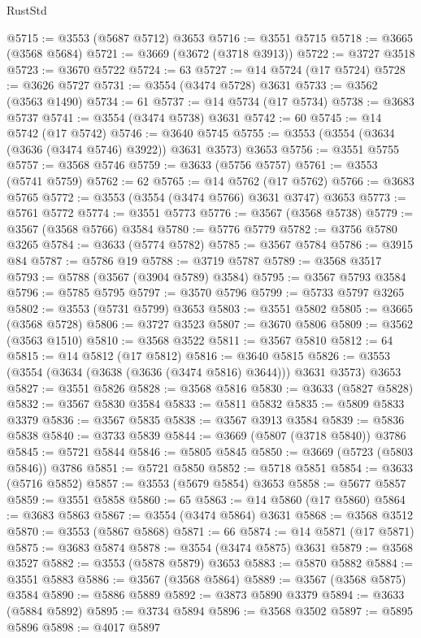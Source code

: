 \begin{lexlean}{RustStd}
\begin{coremodule}
@5715 := @3553 (@5687 @5712) @3653
@5716 := @3551 @5715
@5718 := @3665 (@3568 @5684)
@5721 := @3669 (@3672 (@3718 @3913))
@5722 := @3727 @3518
@5723 := @3670 @5722
@5724 := 63
@5727 := @14 @5724 (@17 @5724)
@5728 := @3626 @5727
@5731 := @3554 (@3474 @5728) @3631
@5733 := @3562 (@3563 @1490)
@5734 := 61
@5737 := @14 @5734 (@17 @5734)
@5738 := @3683 @5737
@5741 := @3554 (@3474 @5738) @3631
@5742 := 60
@5745 := @14 @5742 (@17 @5742)
@5746 := @3640 @5745
@5755 := @3553 (@3554 (@3634 (@3636 (@3474 @5746) @3922)) @3631 @3573) @3653
@5756 := @3551 @5755
@5757 := @3568 @5746
@5759 := @3633 (@5756 @5757)
@5761 := @3553 (@5741 @5759)
@5762 := 62
@5765 := @14 @5762 (@17 @5762)
@5766 := @3683 @5765
@5772 := @3553 (@3554 (@3474 @5766) @3631 @3747) @3653
@5773 := @5761 @5772
@5774 := @3551 @5773
@5776 := @3567 (@3568 @5738)
@5779 := @3567 (@3568 @5766) @3584
@5780 := @5776 @5779
@5782 := @3756 @5780 @3265
@5784 := @3633 (@5774 @5782)
@5785 := @3567 @5784
@5786 := @3915 @84
@5787 := @5786 @19
@5788 := @3719 @5787
@5789 := @3568 @3517
@5793 := @5788 (@3567 (@3904 @5789) @3584)
@5795 := @3567 @5793 @3584
@5796 := @5785 @5795
@5797 := @3570 @5796
@5799 := @5733 @5797 @3265
@5802 := @3553 (@5731 @5799) @3653
@5803 := @3551 @5802
@5805 := @3665 (@3568 @5728)
@5806 := @3727 @3523
@5807 := @3670 @5806
@5809 := @3562 (@3563 @1510)
@5810 := @3568 @3522
@5811 := @3567 @5810
@5812 := 64
@5815 := @14 @5812 (@17 @5812)
@5816 := @3640 @5815
@5826 := @3553 (@3554 (@3634 (@3638 (@3636 (@3474 @5816) @3644))) @3631 @3573) @3653
@5827 := @3551 @5826
@5828 := @3568 @5816
@5830 := @3633 (@5827 @5828)
@5832 := @3567 @5830 @3584
@5833 := @5811 @5832
@5835 := @5809 @5833 @3379
@5836 := @3567 @5835
@5838 := @3567 @3913 @3584
@5839 := @5836 @5838
@5840 := @3733 @5839
@5844 := @3669 (@5807 (@3718 @5840)) @3786
@5845 := @5721 @5844
@5846 := @5805 @5845
@5850 := @3669 (@5723 (@5803 @5846)) @3786
@5851 := @5721 @5850
@5852 := @5718 @5851
@5854 := @3633 (@5716 @5852)
@5857 := @3553 (@5679 @5854) @3653
@5858 := @5677 @5857
@5859 := @3551 @5858
@5860 := 65
@5863 := @14 @5860 (@17 @5860)
@5864 := @3683 @5863
@5867 := @3554 (@3474 @5864) @3631
@5868 := @3568 @3512
@5870 := @3553 (@5867 @5868)
@5871 := 66
@5874 := @14 @5871 (@17 @5871)
@5875 := @3683 @5874
@5878 := @3554 (@3474 @5875) @3631
@5879 := @3568 @3527
@5882 := @3553 (@5878 @5879) @3653
@5883 := @5870 @5882
@5884 := @3551 @5883
@5886 := @3567 (@3568 @5864)
@5889 := @3567 (@3568 @5875) @3584
@5890 := @5886 @5889
@5892 := @3873 @5890 @3379
@5894 := @3633 (@5884 @5892)
@5895 := @3734 @5894
@5896 := @3568 @3502
@5897 := @5895 @5896
@5898 := @4017 @5897

\end{coremodule}
\end{lexlean}
